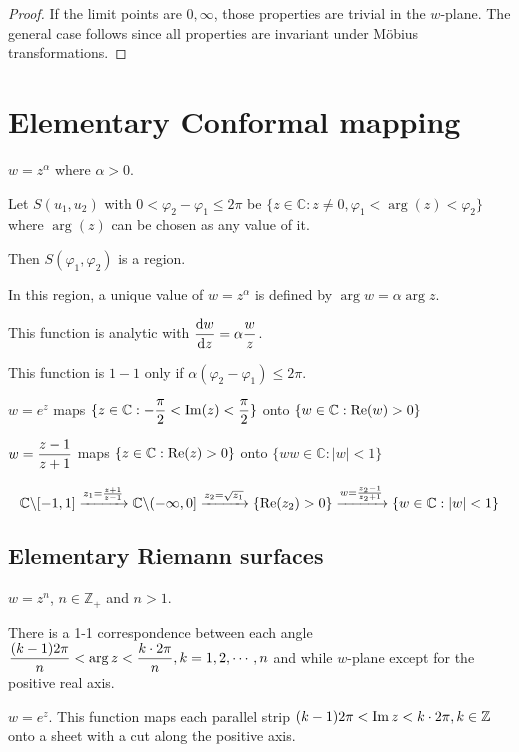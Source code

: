 \begin{proof}
    If the limit points are  $ 0,\infty $, those properties are trivial in the  $ w $-plane. The general case follows since all properties are invariant under M{\"o}bius transformations.
\end{proof}
\section{Elementary Conformal mapping}
\begin{example}
    $ w=z^\alpha $ where  $ \alpha>0 $.
    
    Let  $ S(u_1,u_2) $ with  $ 0<\varphi_2-\varphi_1 \leq 2\pi $ be  $ \{z\in \mathbb{C}:z\neq0,\varphi_1<\arg(z)<\varphi_2\} $ where  $ \arg(z) $ can be chosen as any value of it.   

    Then  $ S(\varphi_1,\varphi_2) $ is a region.
    
    In this region, a unique value of  $ w=z^\alpha $ is defined by  $ \arg w=\alpha\arg z $.
    
    This function is analytic with  $ \displaystyle\frac{\mathrm{d}w}{\mathrm{d}z}=\alpha\displaystyle\frac{w}{z} $.
    
    This function is  $ 1-1 $ only if  $ \alpha(\varphi_2-\varphi_1) \leq 2\pi $.  
\end{example}
\begin{example}
    $ w=e^z  $  maps  $ \{z\in \mathbb{C}:\displaystyle-\frac{\pi }{2}<\operatorname{Im}(z)<\frac{\pi}{2}\} $ onto  $ \{w\in\mathbb{C}:\mathrm{Re}( w)>0\} $ 
\end{example}
\begin{example}
    $ w=\displaystyle\frac{z-1}{z+1} $ maps  $ \{z\in \mathbb{C}:\mathrm{Re}(z)>0\} $ onto  $ \{ww\in \mathbb{C}:|w|<1\} $   
\end{example}
\begin{example}
    \begin{equation}
        \mathbb{C}\backslash[-1,1]\xrightarrow{z_1=\frac{z+1}{z-1}}\mathbb{C}\backslash(-\infty,0]\xrightarrow{z_2=\sqrt{z_1}}\{\mathrm{Re}(z_2)>0\}\xrightarrow{w=\frac{z_2-1}{z_2+1}}\{w\in\mathbb{C}:|w|<1\}
    \end{equation}
\end{example}
\subsection{Elementary Riemann surfaces}
\begin{example}
    $ w=z^n $,  $ n\in \mathbb{Z}_+ $ and  $ n>1 $.
    
    There is a 1-1 correspondence between each angle  $ \displaystyle\frac{(k-1)2\pi}{n}<\arg z<\frac{k\cdot 2\pi}{n},k=1,2,\cdots,n $ and while  $ w $-plane except for the positive real axis.  
\end{example}
\begin{example}
    $ w=e^z $. This function maps each parallel strip $ (k-1)2\pi<\operatorname{Im} z<k\cdot 2\pi, k\in \mathbb{Z} $ onto a sheet with a  cut along the positive axis.
\end{example}
